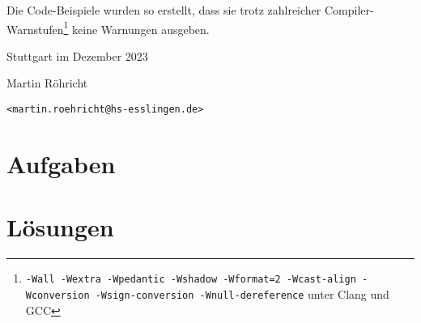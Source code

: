 \documentclass{coding-exercises}
\begin{document}
Die Code-Beispiele wurden so erstellt, dass sie trotz zahlreicher
Compiler-Warnstufen\footnote{\texttt{-Wall -Wextra -Wpedantic -Wshadow
-Wformat=2 -Wcast-align -Wconversion -Wsign-conversion -Wnull-dereference} unter
Clang und GCC} keine Warnungen ausgeben.

\raggedleft
\noindent Stuttgart im Dezember 2023\par
\noindent Martin Röhricht\par
\texttt{<martin.roehricht@hs-esslingen.de>}

\tableofcontents

\mainmatter
\part{Aufgaben}



\setcounter{chapter}{0} %
\part{Lösungen}




\backmatter
\end{document}
